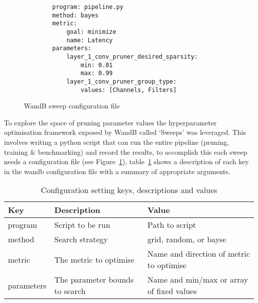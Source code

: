 \documentclass[../Dissertation.tex]{subfiles}
\begin{document}
\singlespacing
\begin{figure}[H]
    \begin{verbatim}
        program: pipeline.py
        method: bayes
        metric:
            goal: minimize
            name: Latency
        parameters:
            layer_1_conv_pruner_desired_sparsity:
                min: 0.01
                max: 0.99
            layer_1_conv_pruner_group_type:
                values: [Channels, Filters]
    \end{verbatim}
    \caption{WandB sweep configuration file}
    \label{fig:sweepConfig}
\end{figure}
\doublespacing

To explore the space of pruning parameter values the hyperparameter optimisation framework exposed by WandB called `Sweeps' was leveraged. 
This involves writing a python script that can run the entire pipeline (pruning, training \& benchmarking) and record the results, to accomplish this each sweep needs a configuration file (see Figure~\ref{fig:sweepConfig}), table~\ref{tab:WandBConfig} shows a description of each key in the wandb configuration file with a summary of appropriate arguments. 



\begin{table}[H]
    \begin{tabular}{@{}|l|l|l|@{}}
    \toprule
    Key        & Description                    & Value                                    \\ \midrule
    program    & Script to be run               & Path to script                           \\ \midrule
    method     & Search strategy                & grid, random, or bayse                   \\ \midrule
    metric     & The metric to optimise         & Name and direction of metric to optimise \\ \midrule
    parameters & The parameter bounds to search & Name and min/max or array of fixed values  \\ \bottomrule
    \end{tabular}
    \caption{Configuration setting keys, descriptions and values}
    \label{tab:WandBConfig}
\end{table}


\end{document}
